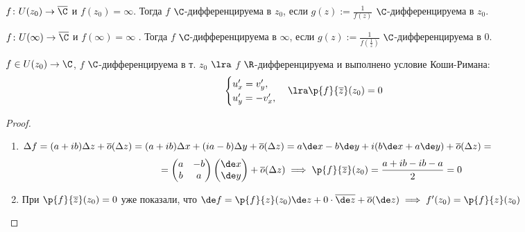 \begin{definition}
  $f\colon U(z_0)\to \overline{\C}$ и $f(z_0)=\infty$. Тогда $f$ $\C$-дифференцируема в $z_0$, если $g(z):=\frac{1}{f(z)}$ $\C$-дифференцируема в $z_0$.  
\end{definition}
\begin{definition}
  $f\colon U(\infty)\to \overline{\C}$ и $f(\infty)=\infty$ . Тогда $f$ $\C$-дифференцируема в $\infty$, если $g(z):=\frac{1}{f(\frac{1}{z})}$  $\C$-дифференцируема в 0.  
\end{definition}
\begin{theorem}
  $f\in U(z_0)\to\C$, $f$ $\C$-дифференцируема в т. $z_0$ $\lra$ $f$ $\R$-дифференцируема и выполнено условие Коши-Римана:
  \[ 
  \begin{cases}
    u'_x = v'_y, \\
    u'_y=-v'_x, 
  \end{cases}\lra \p{f}{\overline{z}}(z_0)=0\]
\end{theorem}
\begin{proof}
 \begin{enumerate}
   \item[($\Rightarrow$):] $\Delta f = (a+ib)\Delta z + \overline{o}(\Delta z) = (a+ib)\Delta x + (ia-b)\Delta y + \overline{o}(\Delta z) = a\de x - b\de y + i(b\de x+ a\de y) +\overline{o}(\Delta z)=$
   \[=\begin{pmatrix}a&-b\\b&a\end{pmatrix}\begin{pmatrix}\de x\\\de y\end{pmatrix}+\overline{o}(\Delta z)\implies \p{f}{\overline{z}}(z_0) = \frac{a + ib -ib -a}{2} = 0\]
     \item[($\Leftarrow$):] При $\p{f}{\overline{z}}(z_0)=0$ уже показали, что $\de f = \p{f}{z}(z_0)\de z + 0 \cdot \overline{\de z} + \overline{o}(\de z)\implies f'(z_0) = \p{f}{z}(z_0)$
 \end{enumerate} 
\end{proof}
